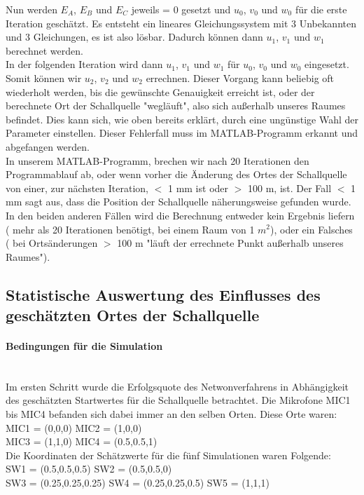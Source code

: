 Nun werden $E_{A}$, $E_{B}$ und $E_{C}$ jeweils = 0 gesetzt und $u_{0}$, $v_{0}$ und $w_{0}$ für die erste Iteration geschätzt. Es entsteht ein lineares Gleichungssystem mit 3 Unbekannten und 3 Gleichungen, es ist also lösbar. Dadurch können dann $u_{1}$, $v_{1}$ und $w_{1}$ berechnet werden.\\ 
In der folgenden Iteration wird dann $u_{1}$, $v_{1}$ und $w_{1}$ für $u_{0}$, $v_{0}$ und $w_{0}$ eingesetzt. Somit können wir $u_{2}$, $v_{2}$ und $w_{2}$ errechnen. Dieser Vorgang kann beliebig oft wiederholt werden, bis die gewünschte Genauigkeit erreicht ist, oder der berechnete Ort der Schallquelle "wegläuft", also sich außerhalb unseres Raumes befindet. Dies kann sich, wie oben bereits erklärt, durch eine ungünstige Wahl der Parameter einstellen. Dieser Fehlerfall muss im MATLAB-Programm erkannt und abgefangen werden. \\

In unserem MATLAB-Programm, brechen wir nach 20 Iterationen den Programmablauf ab, oder wenn vorher die Änderung des Ortes der Schallquelle von einer, zur nächsten Iteration, $<$ 1 mm ist oder $>$ 100 m, ist. Der Fall $<$ 1 mm sagt aus, dass die Position der Schallquelle näherungsweise gefunden wurde. In den beiden anderen Fällen wird die Berechnung entweder kein Ergebnis liefern ( mehr als 20 Iterationen benötigt, bei einem Raum von 1 $m^{2}$), oder ein Falsches ( bei Ortsänderungen $>$ 100 m "läuft der errechnete Punkt außerhalb unseres Raumes").

\subsection{Statistische Auswertung des Einflusses des geschätzten Ortes der Schallquelle}
\paragraph{Bedingungen für die Simulation}\ \\ 
Im ersten Schritt wurde die Erfolgsquote des Netwonverfahrens in Abhängigkeit des geschätzten Startwertes für die Schallquelle betrachtet. Die Mikrofone MIC1 bis MIC4 befanden sich dabei immer an den selben Orten. Diese Orte waren:\\
MIC1 = (0,0,0)
MIC2 = (1,0,0)\\
MIC3 = (1,1,0)
MIC4 = (0.5,0.5,1)\\
Die Koordinaten der Schätzwerte für die fünf Simulationen waren Folgende:\\
SW1 = (0.5,0.5,0.5)
SW2 = (0.5,0.5,0)\\
SW3 = (0.25,0.25,0.25)
SW4 = (0.25,0.25,0.5)
SW5 = (1,1,1)

